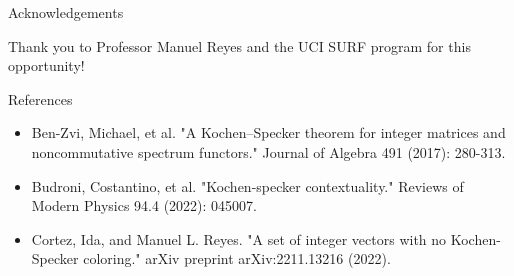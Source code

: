 \documentclass[11pt]{beamer}
\begin{document}
\begin{frame}{Acknowledgements}

	\centering
	
	\Large{Thank you to Professor Manuel Reyes and the UCI SURF program for this opportunity!}
	
\end{frame}

\begin{frame}{References}

\begin{itemize}

\item Ben-Zvi, Michael, et al. "A Kochen–Specker theorem for integer matrices and noncommutative spectrum functors." Journal of Algebra 491 (2017): 280-313.

\item Budroni, Costantino, et al. "Kochen-specker contextuality." Reviews of Modern Physics 94.4 (2022): 045007.

\item Cortez, Ida, and Manuel L. Reyes. "A set of integer vectors with no Kochen-Specker coloring." arXiv preprint arXiv:2211.13216 (2022).

\end{itemize}

\end{frame}
\end{document}
